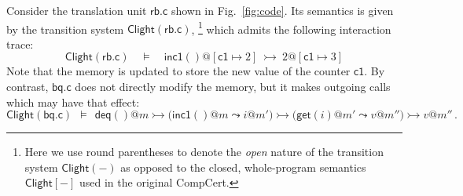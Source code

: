 \documentclass[acmsmall,screen,review,anonymous]{acmart}
\newcommand{\kw}[1]{\ensuremath{ \mathsf{#1} }}
\newcommand{\que}{\circ}
\newcommand{\ans}{\bullet}
\begin{document}

\begin{example} \label{ex:overview:clightsem} %
Consider the translation unit $\kw{rb.c}$ shown in Fig.~\ref{fig:code}.
Its semantics is given by 
the transition system $\kw{Clight}(\kw{rb.c})$,\!%
\footnote{%
  Here we use round parentheses to denote
  the \emph{open} nature of the transition system $\kw{Clight}(-)$
  as opposed to the closed, whole-program semantics $\kw{Clight}[-]$
  used in the original CompCert.}
which admits the following interaction trace:
\[
  \kw{Clight}(\kw{rb.c}) \quad \vDash \quad
  \kw{inc1}()@[\kw{c1} \mapsto 2]
  \: \rightarrowtail \:
  2@[\kw{c1} \mapsto 3]
\]
Note that the memory is updated to store the new value of the counter $\kw{c1}$.
By contrast, $\kw{bq.c}$
does not directly modify the memory,
but it makes outgoing calls which may have that effect:
\[
  \kw{Clight}(\kw{bq.c}) \:\: \vDash \:\:
  \kw{deq}()@m
  \rightarrowtail
  \big( \kw{inc1}()@m \leadsto i@m' \big)
  \rightarrowtail
  \big( \kw{get}(i)@m' \leadsto v@m'' \big)
  \rightarrowtail
  v@m''
  \,.
\]
\end{example}

\end{document}

